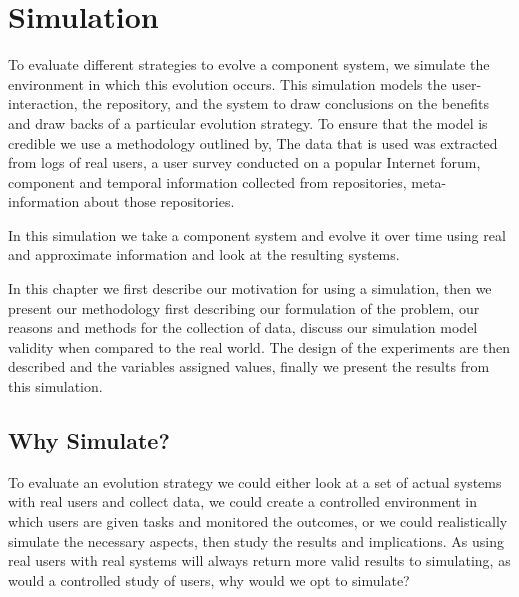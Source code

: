 \chapter{Simulation}
{}To evaluate different strategies to evolve a component system, we simulate the environment in which this evolution occurs.
{}This simulation models the user-interaction, the repository, and the system
{}to draw conclusions on the benefits and draw backs of a particular evolution strategy.
{}To ensure that the model is credible we use a methodology outlined by, %
{}The data that is used was extracted from logs of real users, a user survey conducted on a popular Internet forum, 
{}component and temporal information collected from repositories, meta-information about those repositories.

{}In this simulation we take a component system and evolve it over time using real and approximate information and look at the resulting systems.

{}In this chapter we first describe our motivation for using a simulation,
{}then we present our methodology
{}first describing our formulation of the problem,
{}our reasons and methods for the collection of data,
{}discuss our simulation model validity when compared to the real world.
{}The design of the experiments are then described and the variables assigned values,
{}finally we present the results from this simulation.
 
\section{Why Simulate?}
To evaluate an evolution strategy we could either look at a set of actual systems with real users and collect data,
we could create a controlled environment in which users are given tasks and monitored the outcomes,
or we could realistically simulate the necessary aspects, then study the results and implications.
As using real users with real systems will always return more valid results to simulating, as would a controlled study of users,
why would we opt to simulate?

